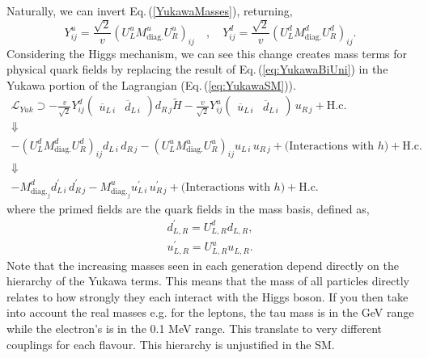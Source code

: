 \documentclass[10pt]{book}
\renewcommand{\(}{\left(}
\renewcommand{\)}{\right)}
\renewcommand{\[}{\left[}
\renewcommand{\]}{\right]}
\begin{document}
Naturally, we can invert Eq.\,(\ref{YukawaMasses}), returning, 
\begin{equation}
\label{eq:YukawaBiUni}
Y^u_{ij} = \frac{\sqrt{2}}{v} (U_L^u M^u_{\text{diag.}} U_R^u)_{ij} \quad , \quad Y^d_{ij} = \frac{\sqrt{2}}{v} (U_L^d M^d_{\text{diag.}} U_R^d)_{ij} . 
\end{equation}
%
Considering the Higgs mechanism, we can see this change creates mass terms for physical quark fields by replacing the result of Eq.\,(\ref{eq:YukawaBiUni}) in the Yukawa portion of the Lagrangian (Eq.\,(\ref{eq:YukawaSM})).
%
\begin{gather}
\mathcal{L}_{Yuk} \supset 
- \frac{v}{\sqrt{2}} Y^d_{ij} \begin{pmatrix} \overline{u}_{L\,i} & \overline{d}_{L\,i}  \end{pmatrix}  d_{R\,j} \tilde{H}
%
-\frac{v}{\sqrt{2}} Y^u_{ij} \begin{pmatrix} \overline{u}_{L\,i} & \overline{d}_{L\,i}  \end{pmatrix} \, u_{R\,j} + \text{H.c.} \nonumber  \\ 
 \Downarrow \nonumber \\
-(U_L^d M^d_{\text{diag.}} U_R^d)_{ij} d_{L\,i} \, d_{R\,j}  - (U_L^u M^u_{\text{diag.}} U_R^u)_{ij} u_{L\,i} \, u_{R\,j} + \big(\text{Interactions with } h\big) + \text{H.c.} \\ 
 \Downarrow  \nonumber \\ 
-M^d_{\text{diag.}_j} d_{L\,i}^\prime \, d_{R\,j}^\prime  - M^u_{\text{diag.}_j} u_{L\,i}^\prime \, u_{R\,j}^\prime + \big(\text{Interactions with }h\big) + \text{H.c.}  \nonumber  
\end{gather}
%
where the primed fields are the quark fields in the mass basis, defined as, 
\begin{equation}
\begin{split}
d^\prime_{L,R} = U^d_{L,R} d_{L,R}, \\
u^\prime_{L,R} = U^u_{L,R} u_{L,R}. 
\end{split}  
\end{equation}
% 
Note that the increasing masses seen in each generation depend directly on the  hierarchy of the Yukawa terms. This means that the mass of all particles directly relates to how strongly they each interact with the Higgs boson.
%
If you then take into account the real masses e.g. for the leptons, the tau mass is in the GeV range while the electron's is in the 0.1 MeV range. This translate to very different couplings for each flavour. 
%
This hierarchy is unjustified in the SM. 
\end{document}
